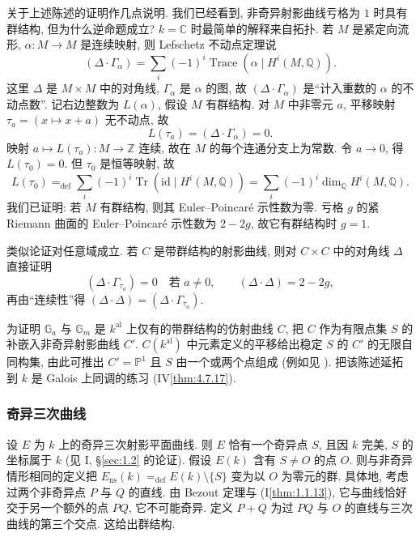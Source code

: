 关于上述陈述的证明作几点说明. 我们已经看到, 非奇异射影曲线亏格为 $1$ 时具有群结构, 但为什么逆命题成立? $k = \mathbb{C}$ 时最简单的解释来自拓扑. 若 $M$ 是紧定向流形, $\alpha\colon M\to M$ 是连续映射, 则 Lefschetz 不动点定理说
\[
(\Delta\cdot\Gamma_\alpha) = \sum_i (-1)^i\operatorname{Trace}(\alpha\mid H^i(M,\mathbb{Q})).
\]
这里 $\Delta$ 是 $M\times M$ 中的对角线, $\Gamma_\alpha$ 是 $\alpha$ 的图, 故 $(\Delta\cdot\Gamma_\alpha)$ 是``计入重数的 $\alpha$ 的不动点数''. 记右边整数为 $L(\alpha)$, 假设 $M$ 有群结构. 对 $M$ 中非零元 $a$, 平移映射 $\tau_a = (x\mapsto x+a)$ 无不动点, 故
\[
L(\tau_a) = (\Delta\cdot\Gamma_\alpha) = 0.
\]
映射 $a\mapsto L(\tau_a)\colon M\to\mathbb{Z}$ 连续, 故在 $M$ 的每个连通分支上为常数. 令 $a\to 0$, 得 $L(\tau_0) = 0$. 但 $\tau_0$ 是恒等映射, 故
\[
L(\tau_0) \mathrel{=_{\mathrm{def}}} \sum_i (-1)^i\operatorname{Tr}(\mathrm{id}\mid H^i(M,\mathbb{Q})) = \sum_i (-1)^i\dim_{\mathbb{Q}}H^i(M,\mathbb{Q}).
\]
我们已证明: 若 $M$ 有群结构, 则其 Euler--Poincar\'e 示性数为零. 亏格 $g$ 的紧 Riemann 曲面的 Euler--Poincar\'e 示性数为 $2-2g$, 故它有群结构时 $g = 1$.

类似论证对任意域成立. 若 $C$ 是带群结构的射影曲线, 则对 $C\times C$ 中的对角线 $\Delta$ 直接证明
\[
(\Delta\cdot\Gamma_{\tau_a}) = 0 \quad \text{若 } a\neq 0, \qquad
(\Delta\cdot\Delta) = 2-2g,
\]
再由``连续性''得 $(\Delta\cdot\Delta) = (\Delta\cdot\Gamma_{\tau_a})$.

为证明 $\mathbb{G}_a$ 与 $\mathbb{G}_m$ 是 $k^{\mathrm{al}}$ 上仅有的带群结构的仿射曲线 $C$, 把 $C$ 作为有限点集 $S$ 的补嵌入非奇异射影曲线 $C'$. $C(k^{\mathrm{al}})$ 中元素定义的平移给出稳定 $S$ 的 $C'$ 的无限自同构集, 由此可推出 $C' = \mathbb{P}^1$ 且 $S$ 由一个或两个点组成 (例如见 \cite[16.16]{milne2017}). 把该陈述延拓到 $k$ 是 Galois 上同调的练习 (IV\ref{thm:4.7.17}).

\subsubsection{奇异三次曲线}

设 $E$ 为 $k$ 上的奇异三次射影平面曲线. 则 $E$ 恰有一个奇异点 $S$, 且因 $k$ 完美, $S$ 的坐标属于 $k$ (见 I, \S\ref{sec:1.2} 的论证). 假设 $E(k)$ 含有 $S\neq O$ 的点 $O$. 则与非奇异情形相同的定义把 $E_{\mathrm{ns}}(k) \mathrel{=_{\mathrm{def}}} E(k)\setminus\{S\}$ 变为以 $O$ 为零元的群. 具体地, 考虑过两个非奇异点 $P$ 与 $Q$ 的直线. 由 Bezout 定理与 (I\ref{thm:1.1.13}), 它与曲线恰好交于另一个额外的点 $PQ$, 它不可能奇异. 定义 $P + Q$ 为过 $PQ$ 与 $O$ 的直线与三次曲线的第三个交点. 这给出群结构.

